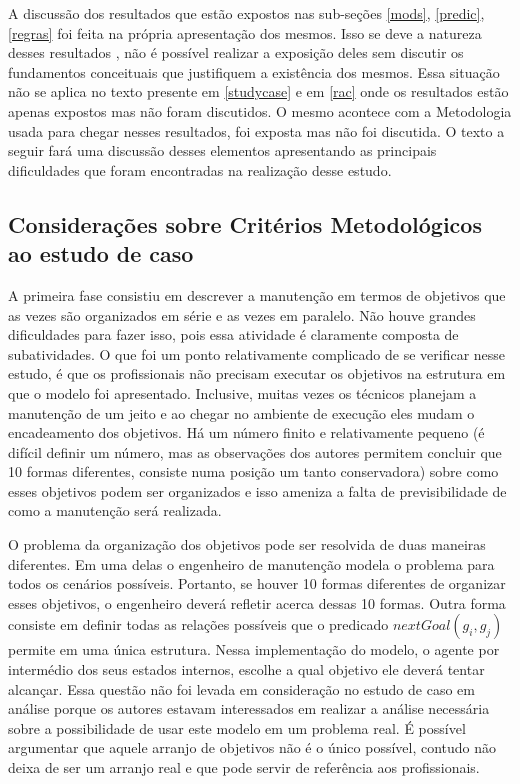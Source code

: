 A discussão dos resultados que estão expostos nas sub-seções \ref{mods}, \ref{predic}, \ref{regras} foi feita na própria apresentação dos mesmos. Isso se deve a natureza desses resultados , não é possível realizar a exposição deles sem discutir os fundamentos conceituais que justifiquem a existência dos mesmos. Essa situação não se aplica no texto presente em \ref{studycase} e em \ref{rac} onde os resultados estão apenas expostos mas não foram discutidos. O mesmo acontece com a Metodologia usada para chegar nesses resultados, foi exposta mas não foi discutida. O texto a seguir fará uma discussão desses elementos apresentando as principais dificuldades que foram encontradas na realização desse estudo. 

\subsection{Considerações sobre Critérios Metodológicos ao estudo de caso} \label{conscritmetcasoestudo}

A primeira fase consistiu em descrever a manutenção em termos de objetivos que as vezes são organizados em série e as vezes em paralelo. Não houve grandes dificuldades para fazer isso, pois essa atividade é claramente composta de subatividades. O que foi um ponto relativamente complicado de se verificar nesse estudo, é que os profissionais não precisam executar os objetivos na estrutura em que o modelo foi apresentado. Inclusive, muitas vezes os técnicos planejam a manutenção de um jeito e ao chegar no ambiente de execução eles mudam o encadeamento dos objetivos. Há um número finito e relativamente pequeno (é difícil definir um número, mas as observações dos autores permitem concluir que 10 formas diferentes, consiste numa posição um tanto conservadora) sobre como esses objetivos podem ser organizados e isso ameniza a falta de previsibilidade de como a manutenção será realizada. 

O problema da organização dos objetivos pode ser resolvida de duas maneiras diferentes. Em uma delas o engenheiro de manutenção modela o problema para todos os cenários possíveis. Portanto, se houver 10 formas diferentes de organizar esses objetivos, o engenheiro deverá refletir acerca dessas 10 formas. Outra forma consiste em definir todas as relações possíveis que o predicado $nextGoal(g_i,g_j)$ permite em uma única estrutura. Nessa implementação do modelo, o agente por intermédio dos seus estados internos, escolhe a qual objetivo ele deverá tentar alcançar. Essa questão não foi levada em consideração no estudo de caso em análise porque os autores estavam interessados em realizar a análise necessária sobre a possibilidade de usar este modelo em um problema real. É possível argumentar que aquele arranjo de objetivos não é o único possível, contudo não deixa de ser um arranjo real e que pode servir de referência aos profissionais. 

